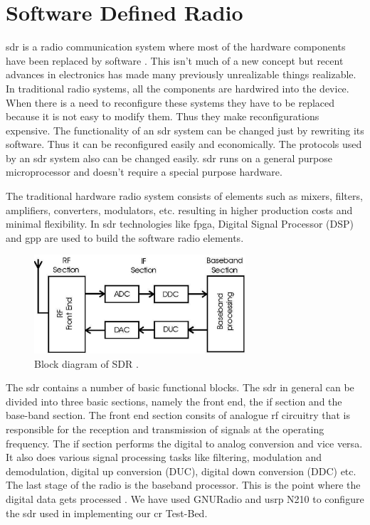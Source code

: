 \chapter{Software Defined Radio}

\gls{sdr} is a radio communication system where most of the 
hardware components have been replaced by software \cite{wikiSDR}. This isn't
much of a new concept but recent advances in electronics has made many
previously unrealizable things realizable. In traditional
radio systems, all the components are hardwired into the device. When there is
a need to reconfigure these systems they have to be replaced because it is
not easy to modify them. Thus they make reconfigurations expensive. The 
functionality of an \gls{sdr} system can be changed just by rewriting its software.
Thus it can be reconfigured easily and economically.
The protocols used by an \gls{sdr} system also can be changed
easily. \gls{sdr} runs on a general
purpose microprocessor and doesn't require a special purpose hardware.

The traditional hardware radio system consists of elements such as mixers, 
filters, amplifiers, converters, modulators, etc. resulting in higher 
production costs and minimal flexibility. In \gls{sdr} technologies like 
\gls{fpga}, Digital Signal Processor (DSP) and 
\gls{gpp} are used to build the software radio elements.


\begin{figure}
  \centering
  \includegraphics[width=0.7\textwidth]{../images/sdrBlock}
  \caption{Block diagram of SDR {\cite{kranthi13}}.}
  \label{sdrBlock}
\end{figure}

The \gls{sdr} contains a number of basic functional blocks.
The \gls{sdr} in general can be divided into three basic sections, namely the front
end, the \gls{if} section and the base-band section. The front end section consits 
of analogue \gls{rf} circuitry that is responsible for the reception and 
transmission of signals at the operating frequency. The \gls{if} section performs
the digital to analog conversion and vice versa. It also does various signal 
processing tasks like filtering, modulation and demodulation, digital up 
conversion (DUC), digital down conversion (DDC) etc. The last stage of the 
radio is the baseband processor. This is the point where the digital data 
gets processed \cite{miller08}\cite{kranthi13}.
We have used GNURadio and \gls{usrp} N210 to configure the \gls{sdr} used in implementing
our \gls{cr} Test-Bed. 

